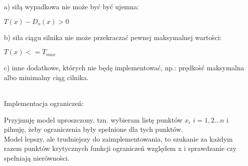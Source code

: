 \documentclass[12pt, letterpaper, twoside]{article}
\begin{document}
a) siłą wypadkowa nie może być być ujemna:
\begin{center}
\(T(x) - D_o(x) > 0\)
\end{center}
b) siła ciągu silnika nie może przekraczać pewnej maksymalnej warto{{\`s}}ci: 
\begin{center}
\(T(x) <= T_{max}\)
\end{center}
c) inne dodatkowe, których nie będę implementować, np.: prędko{{\`s}}ć maksymalna albo minimalny ciąg cilnika. \\\\
\begin{center}
Implementacja ograniczeń: \\
\end{center}
Przyjmuję model uproszczony, tzn. wybieram listę punktów \( x_i\) \(i = 1,2...n \) i pilnuję, żeby ograniczenia były spełnione dla tych punktów. \\
Model lepszy, ale trudniejszy do zaimplementowania, to szukanie za każdym razem punktów krytycznych funkcji ograniczeń względem x i sprawdzanie czy spełniają nierówno{{\`s}}ci.\\
\end{document}
